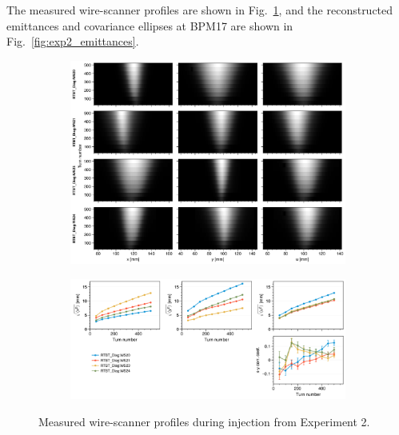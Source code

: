The measured wire-scanner profiles are shown in Fig.~\ref{fig:exp2_wsmeas}, and the reconstructed emittances and covariance ellipses at BPM17 are shown in Fig.~\ref{fig:exp2_emittances}.
%
\begin{figure}[!p]
    \centering
    \begin{subfigure}{\textwidth}
        \includegraphics[width=\textwidth]{Images/chapter5/exp2/waterfall.png}
    \end{subfigure}
    \vfill
    \vspace*{1.25cm}
    \vfill
    \begin{subfigure}{\textwidth}
        \includegraphics[width=\textwidth]{Images/chapter5/exp2/rms.png}
    \end{subfigure}
    \caption{Measured wire-scanner profiles during injection from Experiment 2.}
    \label{fig:exp2_wsmeas}
\end{figure}
%
%

